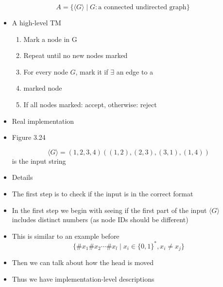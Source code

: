 \begin{frame}[allowframebreaks]
  \begin{equation*}
  A=
\{\langle  G\rangle \mid G:\mbox{a connected undirected graph}\}
\end{equation*}
  \begin{itemize}
\item A high-level TM
  \begin{enumerate}
  \item Mark a node in G
  \item Repeat until no new nodes marked
  \item [] \label{item:1}\qquad For every node $G$, mark it if $\exists$ an edge
to a 
\item [] \qquad marked node
\item If all nodes marked: accept, otherwise: reject
  \end{enumerate}

\item Real implementation

\item [] Figure 3.24

  \begin{center}
\end{center}
\begin{equation*}
\langle  G\rangle=(1,2,3,4)((1,2),(2,3),(3,1),(1,4))
\end{equation*}
is the input string
\item Details
\item The first step is to check if the input is in the correct
  format
\item In the first step we begin with seeing if the first part
  of the input $\langle G \rangle$ includes distinct numbers
  (as node IDs should be different)
\item This is similar to an example before
  \begin{equation*}
\{\#x_1\# x_2 \cdots \# x_l\mid x_i \in 
\{0,1\}^*, x_i \neq x_j\}
\end{equation*}
\item Then we can talk about how the head is moved
\item Thus we have implementation-level descriptions
  

\end{itemize}
\end{frame}

